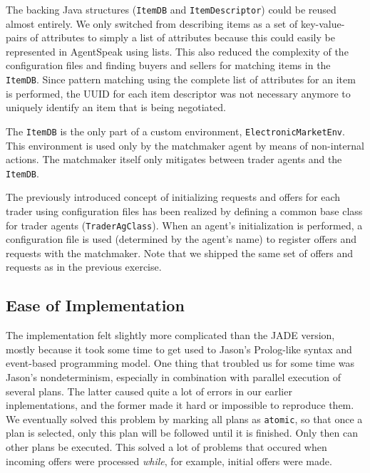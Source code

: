 \documentclass[a4paper,11pt]{article}
\begin{document}
\noindent The backing Java structures (\texttt{ItemDB} and \texttt{ItemDescriptor}) could be reused almost entirely. We only switched from describing items as a set of key-value-pairs of attributes to simply a list of attributes because this could easily be represented in AgentSpeak using lists. This also reduced the complexity of the configuration files and finding buyers and sellers for matching items in the \texttt{ItemDB}. Since pattern matching using the complete list of attributes for an item is performed, the UUID for each item descriptor was not necessary anymore to uniquely identify an item that is being negotiated.

The \texttt{ItemDB} is the only part of a custom environment, \texttt{ElectronicMarketEnv}. This environment is used only by the matchmaker agent by means of non-internal actions. The matchmaker itself only mitigates between trader agents and the \texttt{ItemDB}.

The previously introduced concept of initializing requests and offers for each trader using configuration files has been realized by defining a common base class for trader agents (\texttt{TraderAgClass}). When an agent's initialization is performed, a configuration file is used (determined by the agent's name) to register offers and requests with the matchmaker. Note that we shipped the same set of offers and requests as in the previous exercise.


\subsection{Ease of Implementation}
The implementation felt slightly more complicated than the JADE version, mostly because it took some time to get used to Jason's Prolog-like syntax and event-based programming model. One thing that troubled us for some time was Jason's nondeterminism, especially in combination with parallel execution of several plans. The latter caused quite a lot of errors in our earlier inplementations, and the former made it hard or impossible to reproduce them. We eventually solved this problem by marking all plans as \texttt{atomic}, so that once a plan is selected, only this plan will be followed until it is finished. Only then can other plans be executed. This solved a lot of problems that occured when incoming offers were processed \emph{while}, for example, initial offers were made.
\end{document}
